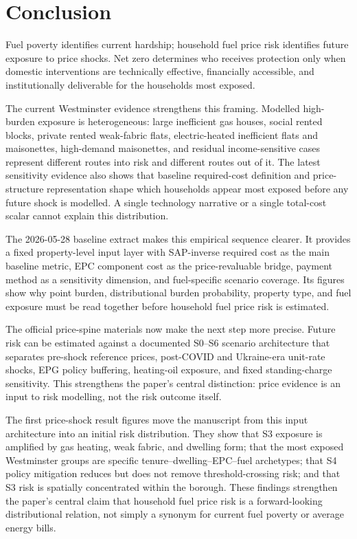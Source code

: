 \section{Conclusion}

Fuel poverty identifies current hardship; household fuel price risk identifies future exposure to price shocks. Net zero determines who receives protection only when domestic interventions are technically effective, financially accessible, and institutionally deliverable for the households most exposed.

The current Westminster evidence strengthens this framing. Modelled high-burden exposure is heterogeneous: large inefficient gas houses, social rented blocks, private rented weak-fabric flats, electric-heated inefficient flats and maisonettes, high-demand maisonettes, and residual income-sensitive cases represent different routes into risk and different routes out of it. The latest sensitivity evidence also shows that baseline required-cost definition and price-structure representation shape which households appear most exposed before any future shock is modelled. A single technology narrative or a single total-cost scalar cannot explain this distribution.

The 2026-05-28 baseline extract makes this empirical sequence clearer. It provides a fixed property-level input layer with SAP-inverse required cost as the main baseline metric, EPC component cost as the price-revaluable bridge, payment method as a sensitivity dimension, and fuel-specific scenario coverage. Its figures show why point burden, distributional burden probability, property type, and fuel exposure must be read together before household fuel price risk is estimated.

The official price-spine materials now make the next step more precise. Future risk can be estimated against a documented S0--S6 scenario architecture that separates pre-shock reference prices, post-COVID and Ukraine-era unit-rate shocks, EPG policy buffering, heating-oil exposure, and fixed standing-charge sensitivity. This strengthens the paper's central distinction: price evidence is an input to risk modelling, not the risk outcome itself.

The first price-shock result figures move the manuscript from this input architecture into an initial risk distribution. They show that S3 exposure is amplified by gas heating, weak fabric, and dwelling form; that the most exposed Westminster groups are specific tenure--dwelling--EPC--fuel archetypes; that S4 policy mitigation reduces but does not remove threshold-crossing risk; and that S3 risk is spatially concentrated within the borough. These findings strengthen the paper's central claim that household fuel price risk is a forward-looking distributional relation, not simply a synonym for current fuel poverty or average energy bills.

